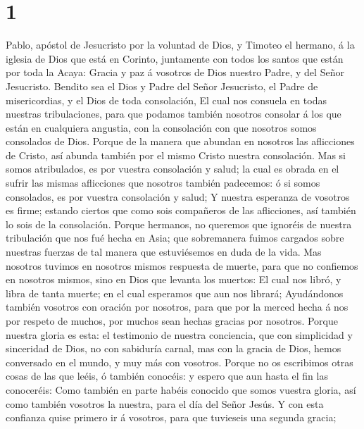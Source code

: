 \hypertarget{section}{%
\section{1}\label{section}}

 Pablo, apóstol de Jesucristo por la voluntad de Dios, y
Timoteo el hermano, á la iglesia de Dios que está en Corinto, juntamente
con todos los santos que están por toda la Acaya:  Gracia y
paz á vosotros de Dios nuestro Padre, y del Señor Jesucristo.
 Bendito sea el Dios y Padre del Señor Jesucristo, el Padre
de misericordias, y el Dios de toda consolación,  El cual
nos consuela en todas nuestras tribulaciones, para que podamos también
nosotros consolar á los que están en cualquiera angustia, con la
consolación con que nosotros somos consolados de Dios. 
Porque de la manera que abundan en nosotros las aflicciones de Cristo,
así abunda también por el mismo Cristo nuestra consolación. 
Mas si somos atribulados, es por vuestra consolación y salud; la cual es
obrada en el sufrir las mismas aflicciones que nosotros también
padecemos: ó si somos consolados, es por vuestra consolación y salud;
 Y nuestra esperanza de vosotros es firme; estando ciertos
que como sois compañeros de las aflicciones, así también lo sois de la
consolación.  Porque hermanos, no queremos que ignoréis de
nuestra tribulación que nos fué hecha en Asia; que sobremanera fuimos
cargados sobre nuestras fuerzas de tal manera que estuviésemos en duda
de la vida.  Mas nosotros tuvimos en nosotros mismos
respuesta de muerte, para que no confiemos en nosotros mismos, sino en
Dios que levanta los muertos:  El cual nos libró, y libra
de tanta muerte; en el cual esperamos que aun nos librará; 
Ayudándonos también vosotros con oración por nosotros, para que por la
merced hecha á nos por respeto de muchos, por muchos sean hechas gracias
por nosotros.  Porque nuestra gloria es esta: el testimonio
de nuestra conciencia, que con simplicidad y sinceridad de Dios, no con
sabiduría carnal, mas con la gracia de Dios, hemos conversado en el
mundo, y muy más con vosotros.  Porque no os escribimos
otras cosas de las que leéis, ó también conocéis: y espero que aun hasta
el fin las conoceréis:  Como también en parte habéis
conocido que somos vuestra gloria, así como también vosotros la nuestra,
para el día del Señor Jesús.  Y con esta confianza quise
primero ir á vosotros, para que tuvieseis una segunda gracia;
